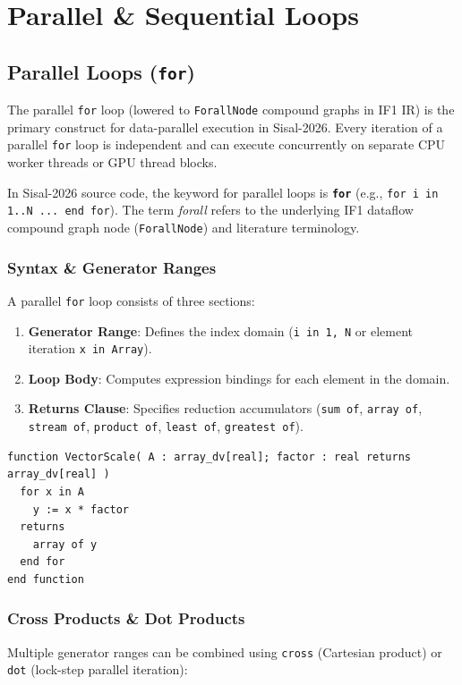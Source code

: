 \chapter{Parallel \& Sequential Loops}
\label{chap:loops_forall}

\section{Parallel Loops (\texttt{for})}
The parallel \texttt{for} loop (lowered to \texttt{ForallNode} compound graphs in IF1 IR) is the primary construct for data-parallel execution in Sisal-2026. Every iteration of a parallel \texttt{for} loop is independent and can execute concurrently on separate CPU worker threads or GPU thread blocks.

\begin{note}
In Sisal-2026 source code, the keyword for parallel loops is \textbf{\texttt{for}} (e.g., \texttt{for i in 1..N ... end for}). The term \emph{forall} refers to the underlying IF1 dataflow compound graph node (\texttt{ForallNode}) and literature terminology.
\end{note}

\subsection{Syntax \& Generator Ranges}
A parallel \texttt{for} loop consists of three sections:
\begin{enumerate}
    \item \textbf{Generator Range}: Defines the index domain (\texttt{i in 1, N} or element iteration \texttt{x in Array}).
    \item \textbf{Loop Body}: Computes expression bindings for each element in the domain.
    \item \textbf{Returns Clause}: Specifies reduction accumulators (\texttt{sum of}, \texttt{array of}, \texttt{stream of}, \texttt{product of}, \texttt{least of}, \texttt{greatest of}).
\end{enumerate}

\begin{lstlisting}[caption={Parallel \texttt{for} Loop Example}]
function VectorScale( A : array_dv[real]; factor : real returns array_dv[real] )
  for x in A
    y := x * factor
  returns
    array of y
  end for
end function
\end{lstlisting}

\subsection{Cross Products \& Dot Products}
Multiple generator ranges can be combined using \texttt{cross} (Cartesian product) or \texttt{dot} (lock-step parallel iteration):

